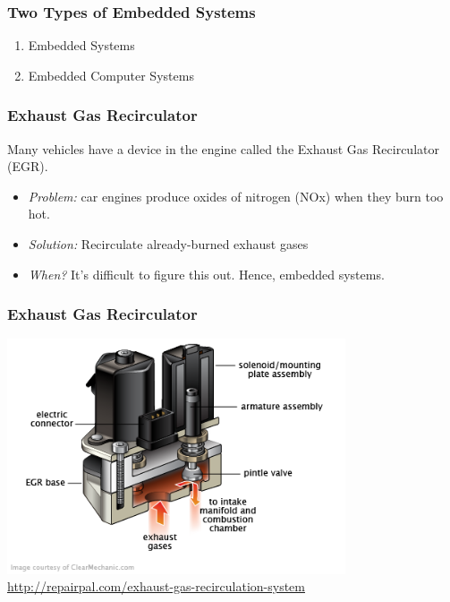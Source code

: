 \begin{frame}
\frametitle{Two Types of Embedded Systems}
\begin{enumerate}
	\item Embedded Systems 
	\item Embedded Computer Systems 
\end{enumerate}
\end{frame}

\begin{frame}
\frametitle{Exhaust Gas Recirculator}

Many vehicles have a device in the engine called the Exhaust Gas Recirculator (EGR).
\begin{itemize}
	\item \emph{Problem:} car engines produce oxides of nitrogen (NOx) when they burn too hot. 
	\item \emph{Solution:} Recirculate
already-burned exhaust gases 
	\item \emph{When?} It's difficult to figure this out. Hence, embedded
systems.
\end{itemize}

\end{frame}

\begin{frame}
\frametitle{Exhaust Gas Recirculator}

\begin{center}
\includegraphics[width=0.75\textwidth]{images/egrvalve.png}
\hfill \url{http://repairpal.com/exhaust-gas-recirculation-system}
\end{center}

\end{frame}

